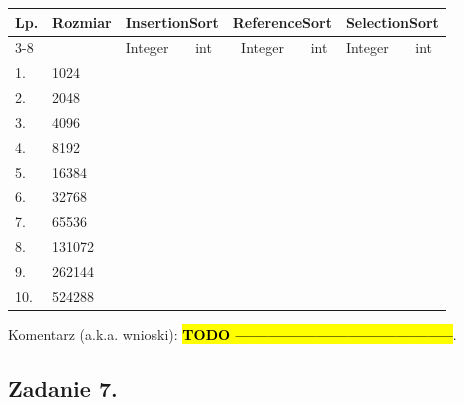 \documentclass[twoside]{article}
\begin{document}
\begin{table}[h]
\begin{tabular}{|l|l|ll|ll|ll|}
\hline
\multirow{2}{*}{Lp.} & \multirow{2}{*}{Rozmiar} & \multicolumn{2}{c|}{InsertionSort} & \multicolumn{2}{l|}{ReferenceSort} & \multicolumn{2}{c|}{SelectionSort} \\ \cline{3-8} 
 &  & \multicolumn{1}{l|}{Integer} & int & \multicolumn{1}{c|}{Integer} & \multicolumn{1}{c|}{int} & \multicolumn{1}{l|}{Integer} & int \\ \hline
1. & 1024 & \multicolumn{1}{l|}{} &  & \multicolumn{1}{l|}{} &  & \multicolumn{1}{l|}{} &  \\ \hline
2. & 2048 & \multicolumn{1}{l|}{} &  & \multicolumn{1}{l|}{} &  & \multicolumn{1}{l|}{} &  \\ \hline
3. & 4096 & \multicolumn{1}{l|}{} &  & \multicolumn{1}{l|}{} &  & \multicolumn{1}{l|}{} &  \\ \hline
4. & 8192 & \multicolumn{1}{l|}{} &  & \multicolumn{1}{l|}{} &  & \multicolumn{1}{l|}{} &  \\ \hline
5. & 16384 & \multicolumn{1}{l|}{} &  & \multicolumn{1}{l|}{} &  & \multicolumn{1}{l|}{} &  \\ \hline
6. & 32768 & \multicolumn{1}{l|}{} &  & \multicolumn{1}{l|}{} &  & \multicolumn{1}{l|}{} &  \\ \hline
7. & 65536 & \multicolumn{1}{l|}{} &  & \multicolumn{1}{l|}{} &  & \multicolumn{1}{l|}{} &  \\ \hline
8. & 131072 & \multicolumn{1}{l|}{} &  & \multicolumn{1}{l|}{} &  & \multicolumn{1}{l|}{} &  \\ \hline
9. & 262144 & \multicolumn{1}{l|}{} &  & \multicolumn{1}{l|}{} &  & \multicolumn{1}{l|}{} &  \\ \hline
10. & 524288 & \multicolumn{1}{l|}{} &  & \multicolumn{1}{l|}{} &  & \multicolumn{1}{l|}{} &  \\ \hline
\end{tabular}
\end{table}

Komentarz (a.k.a. wnioski): \textbf{\hl{TODO -----------------------------------------}}.

\newpage
\subsection{Zadanie 7.}
\end{document}
